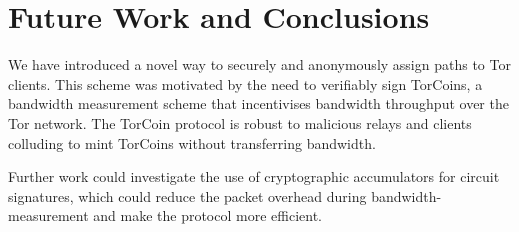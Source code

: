 \section{Future Work and Conclusions} \label{conc}

We have introduced a novel way to securely and anonymously assign paths to
Tor clients. This scheme was motivated by the need to verifiably sign TorCoins,
a bandwidth measurement scheme that incentivises bandwidth throughput over the Tor network. The TorCoin protocol is robust to malicious relays and clients colluding to mint TorCoins without transferring bandwidth. 

Further work could investigate the use of cryptographic accumulators for
circuit signatures, which could reduce the packet overhead during bandwidth-measurement and make the protocol more efficient.
